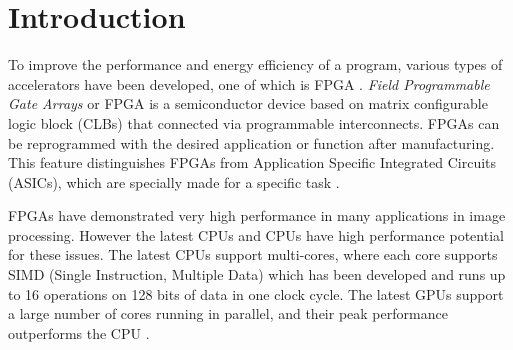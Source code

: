 \section{Introduction}


To improve the performance and energy efficiency of a program, various types of accelerators have been developed, one of which is FPGA \cite{lb:cong}. \textit{Field Programmable Gate Arrays} or FPGA is a semiconductor device based on matrix configurable logic block (CLBs) that connected via programmable interconnects. FPGAs can be reprogrammed with the desired application or function after manufacturing. This feature distinguishes FPGAs from Application Specific Integrated Circuits (ASICs), which are specially made for a specific task \cite{XILINX}.



FPGAs have demonstrated very high performance in many applications in image processing. However the latest CPUs and CPUs have high performance potential for these issues. The latest CPUs support multi-cores, where each core supports SIMD (Single Instruction, Multiple Data) which has been developed and runs up to 16 operations on 128 bits of data in one clock cycle. The latest GPUs support a large number of cores running in parallel, and their peak performance outperforms the CPU \cite{lb:asano}.


